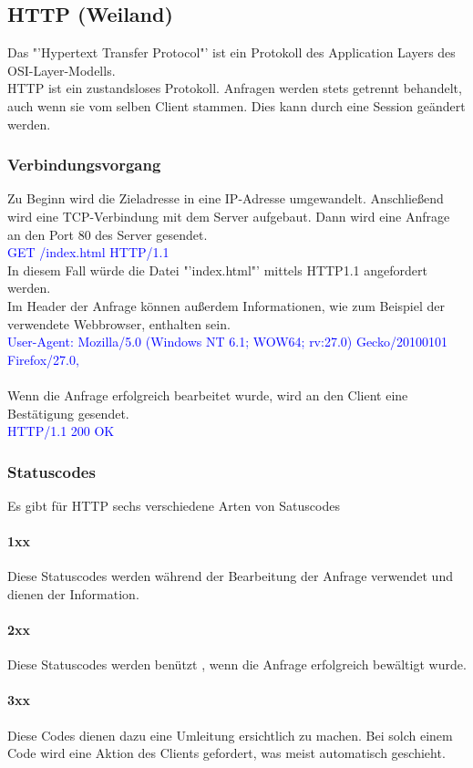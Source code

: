 \subsection{HTTP (Weiland)}

Das "'Hypertext Transfer Protocol"' ist ein Protokoll des Application Layers des OSI-Layer-Modells.
\\
HTTP ist ein zustandsloses Protokoll. Anfragen werden stets getrennt behandelt, auch wenn sie vom selben Client stammen. Dies kann durch eine Session geändert werden.
\subsubsection{Verbindungsvorgang}
Zu Beginn wird die Zieladresse in eine IP-Adresse umgewandelt.
Anschließend wird eine TCP-Verbindung  mit dem Server aufgebaut. 
Dann wird eine Anfrage an den Port 80 des Server gesendet.
\\
\textcolor{blue}{GET /index.html HTTP/1.1}
\\
In diesem Fall würde die Datei "'index.html"' mittels HTTP1.1 angefordert werden.
\\
Im Header der Anfrage können außerdem Informationen, wie zum Beispiel der verwendete Webbrowser, enthalten sein.
\\
\textcolor{blue}{User-Agent: Mozilla/5.0 (Windows NT 6.1; WOW64; rv:27.0) Gecko/20100101 Firefox/27.0,}
\\
\\
Wenn die Anfrage erfolgreich bearbeitet wurde, wird an den Client eine Bestätigung gesendet.
\\
\textcolor{blue}{HTTP/1.1 200 OK}
\subsubsection{Statuscodes}
Es gibt für HTTP sechs verschiedene Arten von Satuscodes
\paragraph{1xx}
Diese Statuscodes werden während der Bearbeitung der Anfrage verwendet und dienen der Information.
\paragraph{2xx}
Diese Statuscodes werden benützt , wenn die Anfrage erfolgreich bewältigt wurde.  
\paragraph{3xx}
Diese Codes dienen dazu eine Umleitung ersichtlich zu machen. Bei solch einem Code wird eine Aktion des Clients gefordert, was meist automatisch geschieht.

